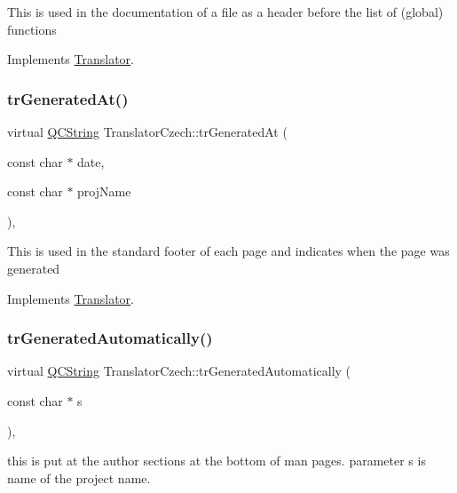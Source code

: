 This is used in the documentation of a file as a header before the list of (global) functions 

Implements \mbox{\hyperlink{class_translator}{Translator}}.

\mbox{\label{class_translator_czech_ab69de55b00955a5044cf11dc50c40a4c}} 
\subsubsection{\texorpdfstring{trGeneratedAt()}{trGeneratedAt()}}
{\footnotesize\ttfamily virtual \mbox{\hyperlink{class_q_c_string}{Q\+C\+String}} Translator\+Czech\+::tr\+Generated\+At (\begin{DoxyParamCaption}\item[{const char $\ast$}]{date,  }\item[{const char $\ast$}]{proj\+Name }\end{DoxyParamCaption})\hspace{0.3cm}{\ttfamily [inline]}, {\ttfamily [virtual]}}

This is used in the standard footer of each page and indicates when the page was generated 

Implements \mbox{\hyperlink{class_translator}{Translator}}.

\mbox{\label{class_translator_czech_a5851645018da0db853c801eefc220aea}} 
\subsubsection{\texorpdfstring{trGeneratedAutomatically()}{trGeneratedAutomatically()}}
{\footnotesize\ttfamily virtual \mbox{\hyperlink{class_q_c_string}{Q\+C\+String}} Translator\+Czech\+::tr\+Generated\+Automatically (\begin{DoxyParamCaption}\item[{const char $\ast$}]{s }\end{DoxyParamCaption})\hspace{0.3cm}{\ttfamily [inline]}, {\ttfamily [virtual]}}

this is put at the author sections at the bottom of man pages. parameter s is name of the project name. 

